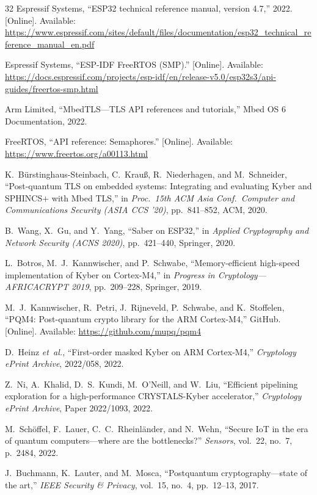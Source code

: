 \documentclass[journal]{IEEEtran}
\begin{document}
\begin{thebibliography}{32}
Espressif Systems, ``ESP32 technical reference manual, version 4.7,'' 2022. [Online]. Available: \url{https://www.espressif.com/sites/default/files/documentation/esp32_technical_reference_manual_en.pdf}

Espressif Systems, ``ESP-IDF FreeRTOS (SMP).'' [Online]. Available: \url{https://docs.espressif.com/projects/esp-idf/en/release-v5.0/esp32s3/api-guides/freertos-smp.html}

Arm Limited, ``MbedTLS---TLS API references and tutorials,'' Mbed OS 6 Documentation, 2022.

FreeRTOS, ``API reference: Semaphores.'' [Online]. Available: \url{https://www.freertos.org/a00113.html}

K.~B\"{u}rstinghaus-Steinbach, C.~Krau\ss, R.~Niederhagen, and M.~Schneider, ``Post-quantum TLS on embedded systems: Integrating and evaluating Kyber and SPHINCS+ with Mbed TLS,'' in \emph{Proc.\ 15th ACM Asia Conf.\ Computer and Communications Security (ASIA CCS '20)}, pp.~841--852, ACM, 2020.

B.~Wang, X.~Gu, and Y.~Yang, ``Saber on ESP32,'' in \emph{Applied Cryptography and Network Security (ACNS 2020)}, pp.~421--440, Springer, 2020.

L.~Botros, M.~J.~Kannwischer, and P.~Schwabe, ``Memory-efficient high-speed implementation of Kyber on Cortex-M4,'' in \emph{Progress in Cryptology---AFRICACRYPT 2019}, pp.~209--228, Springer, 2019.

M.~J.~Kannwischer, R.~Petri, J.~Rijneveld, P.~Schwabe, and K.~Stoffelen, ``PQM4: Post-quantum crypto library for the ARM Cortex-M4,'' GitHub. [Online]. Available: \url{https://github.com/mupq/pqm4}

D.~Heinz \emph{et~al.}, ``First-order masked Kyber on ARM Cortex-M4,'' \emph{Cryptology ePrint Archive}, 2022/058, 2022.

Z.~Ni, A.~Khalid, D.~S.~Kundi, M.~O'Neill, and W.~Liu, ``Efficient pipelining exploration for a high-performance CRYSTALS-Kyber accelerator,'' \emph{Cryptology ePrint Archive}, Paper 2022/1093, 2022.

M.~Sch\"{o}ffel, F.~Lauer, C.~C.~Rheinl\"{a}nder, and N.~Wehn, ``Secure IoT in the era of quantum computers---where are the bottlenecks?'' \emph{Sensors}, vol.~22, no.~7, p.~2484, 2022.

J.~Buchmann, K.~Lauter, and M.~Mosca, ``Postquantum cryptography---state of the art,'' \emph{IEEE Security \& Privacy}, vol.~15, no.~4, pp.~12--13, 2017.


\end{thebibliography}
\end{document}
